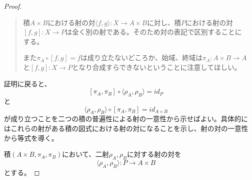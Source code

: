 \documentclass[uplatex,dvipdfmx]{jsarticle}
\newcommand{\arrow}{\rightarrow}
\newcommand{\tuple}[1]{\langle #1\rangle}
\newcommand{\mor}[3]{#1:#2\arrow #3}
\newtheorem{proof}{証明}[section]
\numberwithin{proof}{subsection}
\numberwithin{prop}{subsection}
\numberwithin{define}{subsection}
\begin{document}
\begin{proof}
\begin{quote}
			積$A\times B$における射の対$\mor{\tuple{f,g}}{X}{A\times B}$に対し、積$P$における射の対$\mor{[f,g]}{X}{P}$は全く別の射である。そのため対の表記で区別することにする。

			また$\pi_A\circ[f,g]=f$は成り立たないどころか、始域、終域は$\mor{\pi_A}{A\times B}{A}$と$\mor{[f,g]}{X}{P}$となり合成すらできないということに注意してほしい。
		\end{quote}
		証明に戻ると、\[[\pi_A,\pi_B]\circ\tuple{\rho_A,\rho_B}=id_P\]と
		\[\tuple{\rho_A,\rho_B}\circ[\pi_A,\pi_B]=id_{A\times B}\]が成り立つことを二つの積の普遍性による射の一意性から示せばよい。具体的にはこれらの射がある積の図式における射の対になることを示し、射の対の一意性から等式を導く。

		積$(A\times B,\pi_A,\pi_B)$において、二射$\rho_A,\rho_B$に対する射の対を\[\mor{\tuple{\rho_A,\rho_B}}{P}{A\times B}\]とする。


\end{proof}
\end{document}
